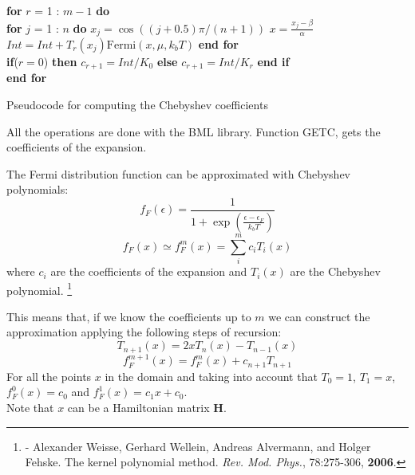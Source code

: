 \begin{algorithm}[H]
  \algrenewcommand{}
  \begin{algorithmic}
    \parskip 0.05cm
    {\fontsize{0.3cm}{0.3em}\selectfont 
      \State \textbf{for} $r$ = 1 : $m - 1$ \textbf{do}\\
      \State \qquad \textbf{for} $j$ = 1 : $n$ \textbf{do}        
      \State \qquad \qquad $x_j = \cos((j+0.5)\pi/(n + 1))$
      \State \qquad \qquad $x = \frac{x_j - \beta}{\alpha}$
      \State \qquad \qquad $Int = Int + T_r(x_j)\mathrm{Fermi}(x,\mu,k_bT)$            
      \State \qquad \textbf{end for}        \\
      \State \qquad \textbf{if}($r = 0$) \textbf{then}
      \State \qquad \qquad $c_{r+1} = Int/K_0$
      \State \qquad \textbf{else}      
      \State \qquad \qquad $c_{r+1} = Int/K_r$
      \State \qquad \textbf{end if}           \\ 
      \State \textbf{end for}
      \EndFunction
    }       
  \end{algorithmic}
  \label{pcode}
  \caption{Pseudocode for computing the Chebyshev coefficients}
\end{algorithm}

All the operations are done with the BML library. Function GETC, gets the coefficients of the expansion. 


The Fermi distribution function can be approximated with Chebyshev polynomials: 
\begin{equation}
  f_F(\epsilon)= \frac{1}{1+\exp(\frac{\epsilon-\epsilon_F}{k_bT})}
  \label{Fermi}
\end{equation}
\vspace{0.3cm}
\begin{equation}
  f_F(x) \simeq f^m_F(x) = \sum_i^m c_i T_i(x)
\end{equation}
where $c_i$ are the coefficients of the expansion and $T_i(x)$ are the Chebyshev polynomial.
  \footnote{\tiny
    - Alexander Weisse, Gerhard Wellein, Andreas Alvermann, and Holger Fehske. The kernel polynomial method. \textit{Rev. Mod. Phys.}, 78:275-306, \textbf{2006}. 
  }


  This means that, if we know the coefficients up to $m$ we can construct the approximation applying the following steps of recursion: 
\begin{equation}
    T_{n+1}(x) = 2xT_n(x) - T_{n-1}(x) 
\end{equation}
\begin{equation}
    f^{m+1}_F(x) = f^m_F(x) + c_{n+1}T_{n+1}
\end{equation}
For all the points $x$ in the domain and taking into account that $T_0 = 1$, $T_1=x$, $f^0_F(x) = c_0$ and $f^1_F(x) = c_1x + c_0$. \\
\vspace{0.4cm}
Note that $x$ can be a Hamiltonian matrix $\textbf{H}$.


